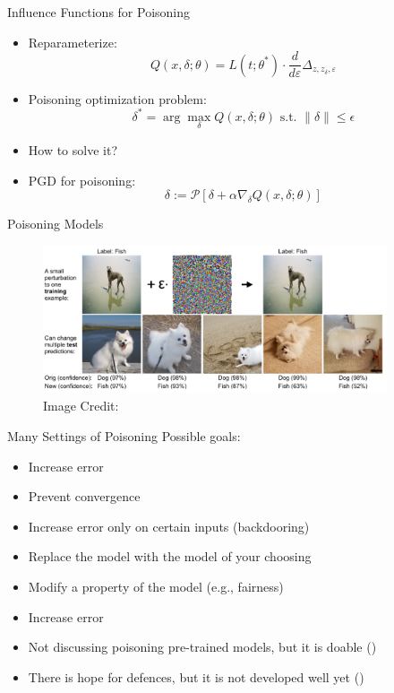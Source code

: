 \documentclass[10pt]{beamer}
\begin{document}
\begin{frame}[fragile]{Influence Functions for Poisoning}
  \begin{itemize}[<+-| alert@+>]
    \item Reparameterize:
      \[
        Q(x, \delta; \theta) = L(t; \theta^*) \cdot \frac{d}{d\varepsilon} \Delta_{z, z_\delta, \varepsilon}
      \]
    \item Poisoning optimization problem:
      \[
        \delta^* = \arg \max_\delta Q(x, \delta; \theta) \text{ s.t. } \parallel \delta \parallel
        \leq \epsilon
      \]
    \item How to solve it?
    \pause
    \item PGD for poisoning:
      \[
        \delta := \mathcal{P}[\delta + \alpha \nabla_\delta Q(x, \delta; \theta)]
      \]
  \end{itemize}
\end{frame}


\begin{frame}{Poisoning Models}
  \begin{figure}
    \includegraphics[width=4in]{poisoning_dog.png} \\
    Image Credit: \cite{KohL17}
  \end{figure}
\end{frame}


\begin{frame}{Many Settings of Poisoning}
  Possible goals:
  \begin{itemize}[<+-| alert@+>]
    \item Increase error
    \item Prevent convergence
    \item Increase error only on certain inputs (backdooring)
    \item Replace the model with the model of your choosing
    \item Modify a property of the model (e.g., fairness)
    \item Increase error
  \end{itemize}
  \begin{itemize}[<+-| alert@+>]
    \item Not discussing poisoning pre-trained models, but it is doable (\cite{BagdasaryanVHES18})
    \item There is hope for defences, but it is not developed well yet (\cite{SteinhardtKL17})
  \end{itemize}
\end{frame}
\end{document}
